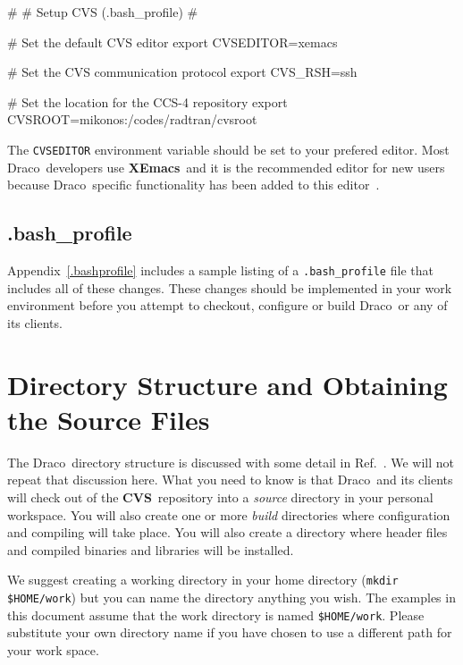 \documentclass[10pt]{nmemo}
\newcommand{\comp}[1]{\normalfont\normalsize\texttt{#1}}
\newcommand{\draco}{{\normalfont\sffamily Draco}}
\newcommand{\cvs}{{\normalfont\bfseries CVS}}
\newcommand{\xemacs}{{\normalfont\bfseries XEmacs}}
\newenvironment{codeExample} %
{\footnotesize 
  \VerbatimEnvironment
  \begin{SaveVerbatim}{\mycode}}%
  {\end{SaveVerbatim}%
  \noindent%
  \parashade[.950]{sharpcorners}{\gdef\outlineboxwidth{.5}%
    \UseVerbatim{\mycode}}\normalsize}
\begin{document}
\begin{codeExample}
#
# Setup CVS (.bash_profile)
#

# Set the default CVS editor
export CVSEDITOR=xemacs

# Set the CVS communication protocol
export CVS_RSH=ssh

# Set the location for the CCS-4 repository
export CVSROOT=mikonos:/codes/radtran/cvsroot
\end{codeExample}

The \comp{CVSEDITOR} environment variable should be set to your
prefered editor.  Most \draco\ developers use \xemacs\ and it is the
recommended editor for new users because \draco\ specific
functionality has been added to this editor~\cite{xtm:9909}.

\subsection{.bash\_profile}

Appendix~\ref{.bashprofile} includes a sample listing of a
\comp{.bash\_profile} file that includes all of these changes.  These
changes should be implemented in your work environment before you
attempt to checkout, configure or build \draco\ or any of its clients.



\section{Directory Structure and Obtaining the Source Files}

The \draco\ directory structure is discussed with some detail in
Ref.~\cite{draco-build}.  We will not repeat that discussion here.
What you need to know is that \draco\ and its clients will check out
of the \cvs\ repository into a \emph{source} directory in your
personal workspace.  You will also create one or more \emph{build}
directories where configuration and compiling will take place.  You
will also create a directory where header files and compiled binaries
and libraries will be installed.

We suggest creating a working directory in your home directory
(\comp{mkdir \${HOME}/work}) but you can name the directory anything
you wish.  The examples in this document assume that the work
directory is named \comp{\${HOME}/work}.  Please substitute your own
directory name if you have chosen to use a different path for your
work space.
\end{document}

